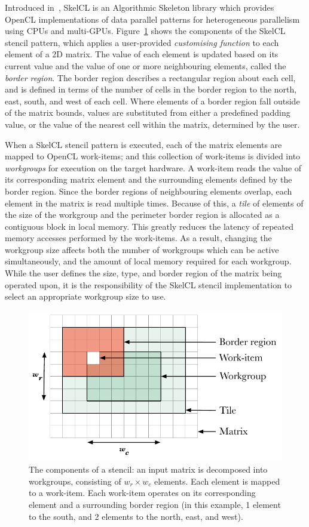 \documentclass[preprint,nonatbib,10pt,nocopyrightspace]{sigplanconf}
\begin{document}
Introduced in~\cite{Steuwer2011}, SkelCL is an Algorithmic Skeleton
library which provides OpenCL implementations of data parallel
patterns for heterogeneous parallelism using CPUs and
multi-GPUs. Figure~\ref{fig:stencil-shape} shows the components of the
SkelCL stencil pattern, which applies a user-provided
\emph{customising function} to each element of a 2D matrix. The value
of each element is updated based on its current value and the value of
one or more neighbouring elements, called the \emph{border
  region}. The border region describes a rectangular region about each
cell, and is defined in terms of the number of cells in the border
region to the north, east, south, and west of each cell. Where
elements of a border region fall outside of the matrix bounds, values
are substituted from either a predefined padding value, or the value
of the nearest cell within the matrix, determined by the user.

When a SkelCL stencil pattern is executed, each of the matrix elements
are mapped to OpenCL work-items; and this collection of work-items is
divided into \emph{workgroups} for execution on the target hardware. A
work-item reads the value of its corresponding matrix element and the
surrounding elements defined by the border region. Since the border
regions of neighbouring elements overlap, each element in the matrix
is read multiple times. Because of this, a \emph{tile} of elements of
the size of the workgroup and the perimeter border region is allocated
as a contiguous block in local memory. This greatly reduces the
latency of repeated memory accesses performed by the work-items. As a
result, changing the workgroup size affects both the number of
workgroups which can be active simultaneously, and the amount of local
memory required for each workgroup. While the user defines the size,
type, and border region of the matrix being operated upon, it is the
responsibility of the SkelCL stencil implementation to select an
appropriate workgroup size to use.

\begin{figure}
\centering
\includegraphics[width=.75\columnwidth]{stencil}
\caption[Stencil border region]{%
  The components of a stencil: an input matrix is decomposed into
  workgroups, consisting of $w_r \times w_c$ elements. Each element is
  mapped to a work-item. Each work-item operates on its corresponding
  element and a surrounding border region (in this example, 1 element
  to the south, and 2 elements to the north, east, and west).
  \vspace{-1em}
}
\label{fig:stencil-shape}
\end{figure}
\end{document}
